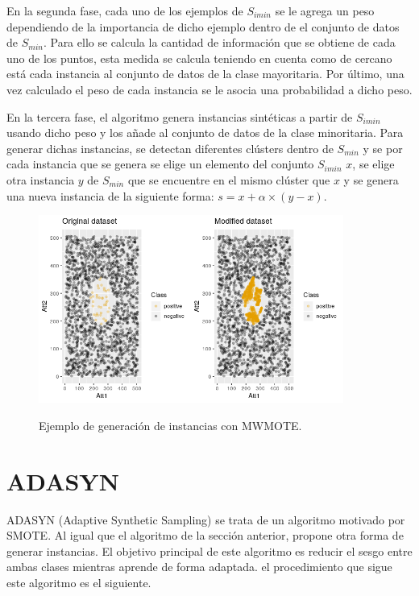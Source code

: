 En la segunda fase, cada uno de los ejemplos de $S_{imin}$ se le agrega un peso dependiendo de la importancia de dicho ejemplo dentro de el conjunto de datos de $S_{min}$. Para ello se calcula la cantidad de información que se obtiene de cada uno de los puntos, esta medida se calcula teniendo en cuenta como de cercano está cada instancia al conjunto de datos de la clase mayoritaria. Por último, una vez calculado el peso de cada instancia se le asocia una probabilidad a dicho peso.\newline

En la tercera fase, el algoritmo genera instancias sintéticas a partir de $S_{imin}$ usando dicho peso y los añade al conjunto de datos de la clase minoritaria. Para generar dichas instancias, se detectan diferentes clústers dentro de $S_{min}$ y se por cada instancia que se genera se elige un elemento del conjunto $S_{imin}$ $x$, se elige otra instancia $y$ de $S_{min}$ que se encuentre en el mismo clúster que $x$ y se genera una nueva instancia de la siguiente forma: $ s = x + \alpha \times (y-x)$. \newline

\begin{figure}[h]
	\centering
	\includegraphics[width=100mm]{imagenes/MWMOTE_comparison.png}
	\label{fig:13}
	\caption{Ejemplo de generación de instancias con MWMOTE.}
\end{figure}
\verticalspace
\newpage
\section{ADASYN}
ADASYN (Adaptive Synthetic Sampling) se trata de un algoritmo motivado por SMOTE. Al igual que el algoritmo de la sección anterior, propone otra forma de generar instancias. El objetivo principal de este algoritmo es reducir el sesgo entre ambas clases mientras aprende de forma adaptada. el procedimiento que sigue este algoritmo es el siguiente.\newline

